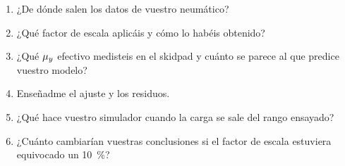 \begin{juez}
\begin{enumerate}
  \item ¿De dónde salen los datos de vuestro neumático?
  \item ¿Qué factor de escala aplicáis y cómo lo habéis obtenido?
  \item ¿Qué $\mu_y$ efectivo medisteis en el skidpad y cuánto se parece al que
        predice vuestro modelo?
  \item Enseñadme el ajuste y los residuos.
  \item ¿Qué hace vuestro simulador cuando la carga se sale del rango ensayado?
  \item ¿Cuánto cambiarían vuestras conclusiones si el factor de escala estuviera
        equivocado un \SI{10}{\percent}?
\end{enumerate}
\end{juez}
